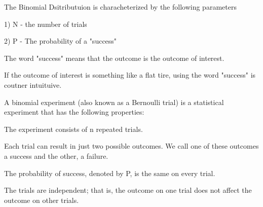 \documentclass[IntroMain.tex]{subfiles}
\begin{document}
\begin{frame}	
	The Binomial Dsitributuion is characheterized by the following parameters
	
	
	
	1) N - the number of trials
	
	2) P - The probability of a "success"
	
	
	
	The word "success" means that the outcome is the outcome of interest.
	
	If the outcome of interest is something like a flat tire, using the word "success" is coutner intuituive.

\end{frame}	
\begin{frame}	
	A binomial experiment (also known as a Bernoulli trial) is a statistical experiment that has the following properties:
	
	The experiment consists of n repeated trials.
	
	
	Each trial can result in just two possible outcomes. We call one of these outcomes a success and the other, a failure.
	
	The probability of success, denoted by P, is the same on every trial.
	
	The trials are independent; that is, the outcome on one trial does not affect the outcome on other trials.
	
\end{frame}	
	
\end{document}
